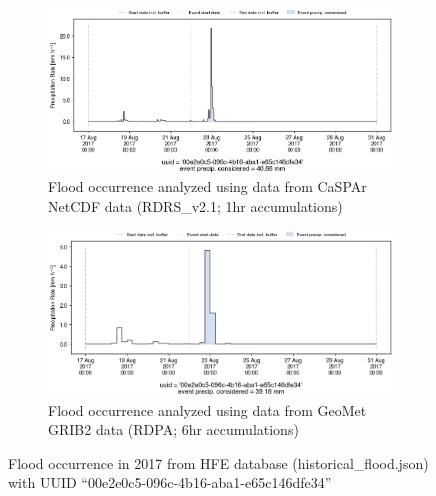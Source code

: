 \documentclass[10pt,a4paper,titlepage,parskip]{scrartcl}
\begin{document}
\begin{figure}[h]
	\begin{subfigure}[a]{1.0\textwidth}
		\centering
		\includegraphics[width=\linewidth]{figures/compare_Geomet_CaSPAr/interpolated_at_stations_occurrence_1043_identified-timesteps_RDRS_v2.1.png}
		\caption{Flood occurrence analyzed using data from CaSPAr NetCDF data (RDRS\_v2.1; 1hr accumulations)}
	\end{subfigure}
	\par\bigskip\bigskip
	\begin{subfigure}[b]{1.0\textwidth}
		\centering
		\includegraphics[width=\linewidth]{figures/compare_Geomet_CaSPAr/interpolated_at_stations_occurrence_1043_identified-timesteps_rdpa_10km_6f.png}
		\caption{Flood occurrence analyzed using data from GeoMet GRIB2 data (RDPA; 6hr accumulations)}
	\end{subfigure}
	\par\bigskip\bigskip
	\caption{Flood occurrence in 2017 from HFE database (historical\_flood.json) with UUID ``00e2e0c5-096c-4b16-aba1-e65c146dfe34''}
\end{figure}
\pagebreak
\end{document}
